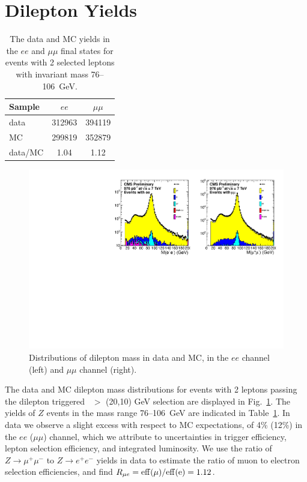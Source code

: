 
\section{Dilepton Yields}

\begin{table}[htb]
\begin{center}
\caption{\label{tab:lepyields}
The data and MC yields in the $ee$ and $\mu\mu$ final states for events with 2 selected
leptons with invariant mass 76--106~GeV.
}
\begin{tabular}{l|cc}
\hline
         Sample   &           $ee$   &       $\mu\mu$   \\
\hline
data              &         312963   &         394119   \\
MC                &         299819   &         352879   \\
\hline
data/MC           &           1.04   &           1.12   \\
\hline
\end{tabular}
\end{center}
\end{table}

\begin{figure}[!htb]
\begin{center}
\includegraphics[width=1.0\linewidth]{plots/dilmass_976pb.pdf}
\caption{\label{fig:Z}\protect Distributions of dilepton mass in data and MC,
in the $ee$ channel (left) and $\mu\mu$ channel (right). 
}
\end{center}
\end{figure}

The data and MC dilepton mass distributions for events with 2 leptons passing the dilepton triggered 
\pt\ $>$ (20,10) GeV selection are displayed in Fig.~\ref{fig:Z}.
The yields of $Z$ events in the mass range 76--106~GeV are indicated in Table~\ref{tab:lepyields}. 
In data we observe a slight excess with respect to MC expectations, of 4\% (12\%) in the $ee$ ($\mu\mu$) channel,
which we attribute to uncertainties in trigger efficiency, lepton selection efficiency, and integrated
luminosity. We use the ratio of $Z \to \mu^+\mu^-$ to $Z \to e^+e^-$ yields in data to estimate the
ratio of muon to electron selection efficiencies, and find $R_{\mu e} = \rm{eff}(\mu)/\rm{eff}(e) = 1.12$.

